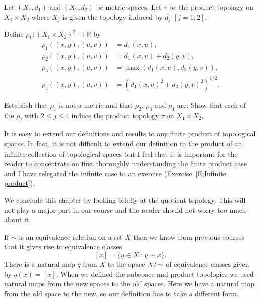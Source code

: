 \begin{exercise}\label{E;metric product} 
Let $(X_{1},d_{1})$ and $(X_{2},d_{2})$ be metric
spaces. Let $\tau$ be the product topology on $X_{1}\times X_{2}$
where $X_{j}$ is given the topology induced by $d_{j}$ $[j=1,2]$.

Define $\rho_{k}:(X_{1}\times X_{2})^{2}\rightarrow {\mathbb R}$
by
\begin{align*}
\rho_{1}((x,y),(u,v))&=d_{1}(x,u),\\ 
\rho_{2}((x,y),(u,v))&=d_{1}(x,u)+d_{2}(y,v),\\
\rho_{3}((x,y),(u,v))&=\max(d_{1}(x,u),d_{2}(y,v)),\\
\rho_{4}((x,y),(u,v))&=(d_{1}(x,u)^{2}+d_{2}(y,v)^{2})^{1/2}.
\end{align*}

Establish that $\rho_{1}$ is not a metric
and that $\rho_{2}$, $\rho_{3}$ and $\rho_{4}$ are.
Show that each of the $\rho_{j}$ with $2\leq j\leq 4$ induce the
product topology $\tau$ on $X_{1}\times X_{2}$.
\end{exercise}
It is easy to extend our definitions and results to
any finite product of topological spaces. In fact,
it is not difficult to extend our definition
to the product of an infinite collection
of topological spaces but I feel
that it is important for the reader to concentrate on
first thoroughly 
understanding the finite product case and I have relegated the 
infinite case to an exercise (Exercise~\ref{E;Infinite product}).  

We conclude this chapter by looking briefly at the
quotient topology. This will not play a major part in
our course and the reader should not worry too much about it.

If $\sim$ is an equivalence relation on a 
set $X$
then we know from previous courses that it gives
rise to equivalence classes
\[[x]=\{y\in X\,:\,y\sim x\}.\]
There is a natural map $q$ from $X$ to the space $X/\negthinspace\sim$
of equivalence classes given by $q(x)=[x]$. When
we defined the subspace and product topologies
we used natural maps from the new spaces to the
old spaces. Here we have a natural map from
the old space to the new, so our definition 
has to take a different form.

